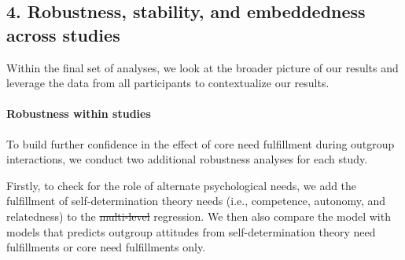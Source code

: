 \documentclass[man, 12pt, a4paper, mask]{apa7}
\theoremstyle{break}
\theoremstyle{plain}
\providecommand{\DIFaddtex}[1]{{\protect\color{blue}\uwave{#1}}} %
\providecommand{\DIFdeltex}[1]{{\protect\color{red}\sout{#1}}}                      %
\providecommand{\DIFaddbegin}{} %
\providecommand{\DIFaddend}{} %
\providecommand{\DIFdelbegin}{} %
\providecommand{\DIFdelend}{} %
\providecommand{\DIFadd}[1]{\texorpdfstring{\DIFaddtex{#1}}{#1}} %
\providecommand{\DIFdel}[1]{\texorpdfstring{\DIFdeltex{#1}}{}} %
\newcommand{\DIFscaledelfig}{0.5}
\newlength{\DIFdelgraphicswidth} %
\newlength{\DIFdelgraphicsheight} %
\newcommand{\DIFaddincludegraphics}[2][]{{\color{blue}\fbox{\DIFOincludegraphics[#1]{#2}}}} %
\newcommand{\DIFdelincludegraphics}[2][]{%
\sbox{\DIFdelgraphicsbox}{\DIFOincludegraphics[#1]{#2}}%
\settoboxwidth{\DIFdelgraphicswidth}{\DIFdelgraphicsbox} %
\settoboxtotalheight{\DIFdelgraphicsheight}{\DIFdelgraphicsbox} %
\scalebox{\DIFscaledelfig}{%
\parbox[b]{\DIFdelgraphicswidth}{\usebox{\DIFdelgraphicsbox}\\[-\baselineskip] \rule{\DIFdelgraphicswidth}{0em}}\llap{\resizebox{\DIFdelgraphicswidth}{\DIFdelgraphicsheight}{%
\setlength{\unitlength}{\DIFdelgraphicswidth}%
\begin{picture}(1,1)%
\thicklines\linethickness{2pt} %
{\color[rgb]{1,0,0}\put(0,0){\framebox(1,1){}}}%
{\color[rgb]{1,0,0}\put(0,0){\line( 1,1){1}}}%
{\color[rgb]{1,0,0}\put(0,1){\line(1,-1){1}}}%
\end{picture}%
}\hspace*{3pt}}} %
} %
\DeclareRobustCommand{\DIFaddbegin}{\DIFOaddbegin \let\includegraphics\DIFaddincludegraphics} %
\DeclareRobustCommand{\DIFaddend}{\DIFOaddend \let\includegraphics\DIFOincludegraphics} %
\DeclareRobustCommand{\DIFdelbegin}{\DIFOdelbegin \let\includegraphics\DIFdelincludegraphics} %
\DeclareRobustCommand{\DIFdelend}{\DIFOaddend \let\includegraphics\DIFOincludegraphics} %
\begin{document}
\subsection{4. Robustness, stability, and embeddedness across studies}
Within the final set of analyses, we look at the broader picture of our results and leverage the data from all participants to contextualize our results.  

\paragraph{Robustness within studies}
To build further confidence in the effect of core need fulfillment during outgroup interactions, we conduct two additional robustness analyses for each study.

Firstly, to check for the role of alternate psychological needs, we add the fulfillment of self-determination theory needs (i.e., competence, autonomy, and relatedness) to the \DIFdelbegin \DIFdel{multi-level }\DIFdelend \DIFaddbegin \DIFadd{multilevel }\DIFaddend regression. We then also compare the model with models that predicts outgroup attitudes from self-determination theory need fulfillments or core need fulfillments only. 
\end{document}
